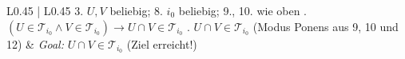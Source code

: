 \documentclass{article}
\begin{document}
\begin{center}
\begin{tabular}{ L{0.45\textwidth} | L{0.45\textwidth} }
3. $U,V$ beliebig; 8. $i_0$ beliebig; 9., 10. wie oben . $(U \in \mathcal{T}_{i_0} \land V \in \mathcal{T}_{i_0}) \rightarrow U \cap V \in \mathcal{T}_{i_0}$ . $U \cap V \in \mathcal{T}_{i_0}$ \quad (Modus Ponens aus 9, 10 und 12) &
\emph{Goal:} $U \cap V \in \mathcal{T}_{i_0}$ \newline
\newline
\checkmark \quad (Ziel erreicht!) \\
\bottomrule
\end{tabular}
\end{center}
\end{document}
